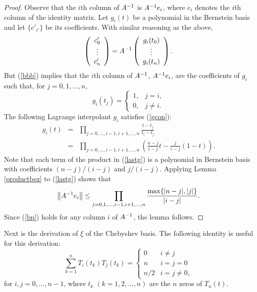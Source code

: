 \documentclass[12pt]{article}
\begin{document}
\begin{proof}
Observe that the $i$th column of $A^{-1}$ is $A^{-1} e_i$, where
$e_i$ denotes the $i$th column of the identity matrix. Let
$g_i(t)$ be a polynomial in the Bernstein basis and let $\{ c'_{i'} \}$ be its coefficients. With
similar reasoning as the above,
\begin{equation}
\label{bbb} \left( \begin{array}{c}
      c'_{0} \\ \vdots \\ c'_{n} \end{array} \right)
= A^{-1} \left( \begin{array}{c}
      g_i(t_0) \\ \vdots \\ g_i(t_n) \end{array} \right).
\end{equation}
But (\ref{bbb}) implies that the $i$th column of $A^{-1}$,
$A^{-1}e_i$, are the coefficients of $g_i$ such that, for
$j=0,1,\ldots, n$,
\begin{equation}
\label{gcon} g_i(t_{j}) = \left\{ \begin{array}{ll}
                     1, & j = i,    \\
                     0, & j \neq i. \end{array}  \right.
\end{equation}
The following Lagrange interpolant $g_i$
satisfies (\ref{gcon}):
\begin{eqnarray}
g_i(t) & = & \prod_{j = 0,\ldots,i-1,i+1,\ldots,n}
\frac{t-t_{j}}{t_i-t_{j}} \nonumber \\
& = & \prod_{j = 0,\ldots,i-1,i+1,\ldots,n}
\left( \frac{n-j}{i-j}t - \frac{j}{i-j}(1-t) \right). \label{lastg}
\end{eqnarray}
Note that each term of the product in (\ref{lastg}) is a polynomial in
Bernstein basis with coefficients  $(n-j)/(i-j)$ and $j/(i-j)$.
Applying Lemma \ref{productbez} to (\ref{lastg}) shows
that
\begin{equation}
\label{bp} \left\|A^{-1}e_i\right\| \leq  \prod_{j=0,1,\ldots,i-1,i+1,\ldots,n} \frac{\max\{|n-j|,|j|\}}{|i-j|}.
\end{equation}
Since (\ref{bp}) holds for any column $i$ of $A^{-1}$,
the lemma follows.
\end{proof}

Next is the derivation of $\xi$ of the Chebyshev basis.  The following
identity is useful for this derivation:
\begin{equation}
\sum_{k=1}^n T_i(t_k)T_j(t_k) = \left\{\begin{array}{ll}0 & i \neq j \\ n & i=j=0\\
n/2 & i=j\neq 0,
\end{array} \right.
\label{relation_zeros_cheb}
\end{equation}
for $i,j=0,\ldots,n-1$, where $t_k$ $(k=1,2,\ldots,n)$ are the $n$ zeros of $T_n(t)$.
\end{document}
